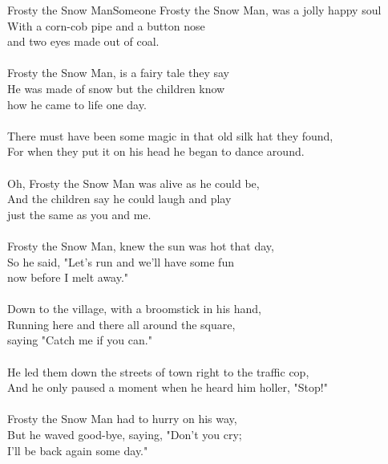 \documentclass[a4paper,12pt]{article}
\begin{document}
\begin{song}{Frosty the Snow Man}{Someone}
Frosty the Snow Man, was a jolly happy soul\\ 
With a corn-cob pipe and a button nose\\
and two eyes made out of coal.\\
\\
Frosty the Snow Man, is a fairy tale they say\\
He was made of snow but the children know \\
how he came to life one day.\\
\\
There must have been some magic in that old silk hat they found,\\
For when they put it on his head he began to dance around.\\
\\
Oh, Frosty the Snow Man was alive as he could be,\\ 
And the children say he could laugh and play \\
just the same as you and me.\\
\\
Frosty the Snow Man,  knew the sun was hot that day,\\
So he said, "Let's run  and we'll have some fun\\
now before I melt away."\\
\\ 
Down to the village, with a broomstick in his hand,\\
Running here and there all around the square,\\
saying "Catch me if you can."\\
\\ 
He led them down the streets of town right to the traffic cop,\\
And he only paused a moment when he heard him holler, "Stop!"\\
\\
Frosty the Snow Man had to hurry on his way,\\
But he waved good-bye, saying, "Don't you cry;\\
I'll be back again some day."\\
\end{song}
\end{document}
